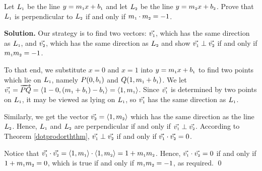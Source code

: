 \documentclass{ximera}
\begin{document}
\begin{example}\label{perpendicularlines2} Let $L_{\mbox{\tiny$1$}}$ be the line $y = m_{\mbox{\tiny$1$}}x + b_{\mbox{\tiny$1$}}$ and let $L_{\mbox{\tiny$2$}}$ be the line $y = m_{\mbox{\tiny$2$}}x + b_{\mbox{\tiny$2$}}$.  Prove that $L_{\mbox{\tiny$1$}}$ is perpendicular to $L_{\mbox{\tiny$2$}}$ if and only if $m_{\mbox{\tiny$1$}} \cdot m_{\mbox{\tiny$2$}} = -1$.

\smallskip

{\bf Solution.}  Our strategy is to find two vectors: $\vec{v_{\mbox{\tiny$1$}}}$, which has the same direction as $L_{\mbox{\tiny$1$}}$,  and $\vec{v_{\mbox{\tiny$2$}}}$, which has the same direction as $L_{\mbox{\tiny$2$}}$ and show $\vec{v_{\mbox{\tiny$1$}}} \perp \vec{v_{\mbox{\tiny$2$}}}$ if and only if $ m_{\mbox{\tiny$1$}}  m_{\mbox{\tiny$2$}} = -1$. 

\smallskip

 To that end, we substitute $x=0$ and $x=1$ into $y = m_{\mbox{\tiny$1$}}x + b_{\mbox{\tiny$1$}}$  to find two points which lie on $L_{\mbox{\tiny$1$}}$, namely $P(0,  b_{\mbox{\tiny$1$}})$ and $Q(1, m_{\mbox{\tiny$1$}} + b_{\mbox{\tiny$1$}})$.  
 We let $\vec{v_{\mbox{\tiny$1$}}} = \overrightarrow{PQ} = \left<1-0,(m_{\mbox{\tiny$1$}}+b_{\mbox{\tiny$1$}}) - b_{\mbox{\tiny$1$}}\right>=\left<1,m_{\mbox{\tiny$1$}}\right>$.  Since  $\vec{v_{\mbox{\tiny$1$}}}$ is determined by two points on $L_{\mbox{\tiny$1$}}$, it may be viewed as lying on $L_{\mbox{\tiny$1$}}$, so $\vec{v_{\mbox{\tiny$1$}}}$  has the same direction as $L_{\mbox{\tiny$1$}}$. 
 
 \smallskip
 
 Similarly, we get the vector  $\vec{v_{\mbox{\tiny$2$}}} = \left<1,m_{\mbox{\tiny$2$}}\right>$ which has the same direction as the line 
$L_{\mbox{\tiny$2$}}$.  Hence, $L_{\mbox{\tiny$1$}}$ and $L_{\mbox{\tiny$2$}}$ are perpendicular if and only if $\vec{v_{\mbox{\tiny$1$}}} \perp \vec{v_{\mbox{\tiny$2$}}}$. According to Theorem \ref{dotprodorththm}, $\vec{v_{\mbox{\tiny$1$}}} \perp \vec{v_{\mbox{\tiny$2$}}}$ if and only if $\vec{v_{\mbox{\tiny$1$}}} \cdot \vec{v_{\mbox{\tiny$2$}}} = 0$.  

\smallskip

Notice that $\vec{v_{\mbox{\tiny$1$}}} \cdot \vec{v_{\mbox{\tiny$2$}}} = \left<1,m_{\mbox{\tiny$1$}}\right> \cdot \left<1,m_{\mbox{\tiny$2$}}\right> = 1 + m_{\mbox{\tiny$1$}}m_{\mbox{\tiny$2$}}$.  Hence,  $\vec{v_{\mbox{\tiny$1$}}} \cdot \vec{v_{\mbox{\tiny$2$}}} = 0$ if and only if $1 + m_{\mbox{\tiny$1$}}m_{\mbox{\tiny$2$}}  =0$, which is true if and only if $ m_{\mbox{\tiny$1$}}  m_{\mbox{\tiny$2$}} = -1$, as required. \qed

\end{example}
\end{document}
